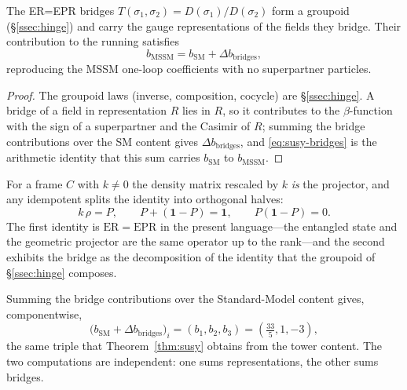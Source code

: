\begin{theorem}\label{thm:susy}
The ER=EPR bridges $T(\sigma_1,\sigma_2)=D(\sigma_1)/D(\sigma_2)$ form a groupoid
(\S\ref*{ssec:hinge}) and carry the gauge representations of the fields they bridge. Their
contribution to the running satisfies
\begin{equation}\label{eq:susy-bridges}
  b_{\mathrm{MSSM}}=b_{\mathrm{SM}}+\Delta b_{\mathrm{bridges}},
\end{equation}
reproducing the MSSM one-loop coefficients with no superpartner particles.


\end{theorem}
\begin{proof}
The groupoid laws (inverse, composition, cocycle) are \S\ref*{ssec:hinge}. A bridge of a field in
representation $R$ lies in $R$, so it contributes to the $\beta$-function with the sign of a
superpartner and the Casimir of $R$; summing the bridge contributions over the SM content gives
$\Delta b_{\mathrm{bridges}}$, and \eqref{eq:susy-bridges} is the arithmetic identity that this sum
carries $b_{\mathrm{SM}}$ to $b_{\mathrm{MSSM}}$.
\end{proof}

\begin{proposition}\label{prop:er-epr-id}
For a frame $C$ with $k\neq0$ the density matrix rescaled by $k$ \emph{is} the projector, and any
idempotent splits the identity into orthogonal halves:
\begin{equation}\label{eq:er-epr-id}
  k\,\rho = P,\qquad P+(\mathbf1-P)=\mathbf1,\qquad P(\mathbf1-P)=0 .
\end{equation}
The first identity is $\mathrm{ER}=\mathrm{EPR}$ in the present language---the entangled state and
the geometric projector are the same operator up to the rank---and the second exhibits the bridge as
the decomposition of the identity that the groupoid of \S\ref{ssec:hinge} composes.


\end{proposition}

\begin{corollary}\label{cor:bridges-mssm}
Summing the bridge contributions over the Standard-Model content gives, componentwise,
\begin{equation}\label{eq:bridges-mssm}
  \big(b_{\mathrm{SM}}+\Delta b_{\mathrm{bridges}}\big)_i=(b_1,b_2,b_3)=(\tfrac{33}5,1,-3),
\end{equation}
the same triple that Theorem~\ref{thm:susy} obtains from the tower content. The two computations are
independent: one sums representations, the other sums bridges.


\end{corollary}

